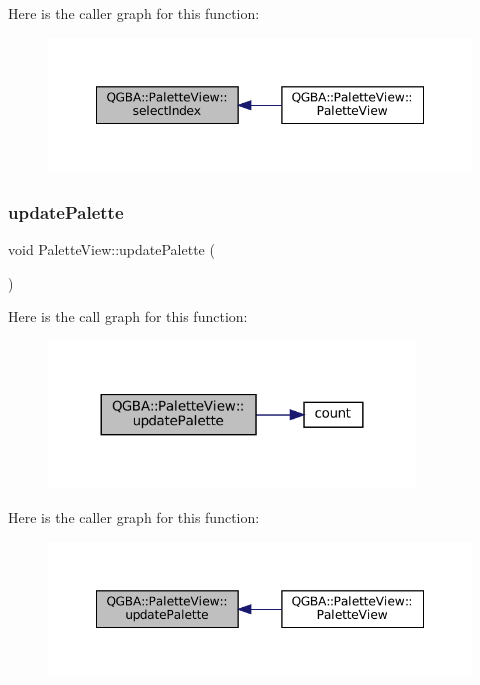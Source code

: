 Here is the caller graph for this function\+:
\nopagebreak
\begin{figure}[H]
\begin{center}
\leavevmode
\includegraphics[width=348pt]{class_q_g_b_a_1_1_palette_view_a80f9e5cbfa2a94ab352b3890225cc04f_icgraph}
\end{center}
\end{figure}
\mbox{\label{class_q_g_b_a_1_1_palette_view_a4b523ba5286a8eb607a8b9295b22c009}} 
\subsubsection{\texorpdfstring{update\+Palette}{updatePalette}}
{\footnotesize\ttfamily void Palette\+View\+::update\+Palette (\begin{DoxyParamCaption}{ }\end{DoxyParamCaption})\hspace{0.3cm}{\ttfamily [slot]}}

Here is the call graph for this function\+:
\nopagebreak
\begin{figure}[H]
\begin{center}
\leavevmode
\includegraphics[width=276pt]{class_q_g_b_a_1_1_palette_view_a4b523ba5286a8eb607a8b9295b22c009_cgraph}
\end{center}
\end{figure}
Here is the caller graph for this function\+:
\nopagebreak
\begin{figure}[H]
\begin{center}
\leavevmode
\includegraphics[width=348pt]{class_q_g_b_a_1_1_palette_view_a4b523ba5286a8eb607a8b9295b22c009_icgraph}
\end{center}
\end{figure}


